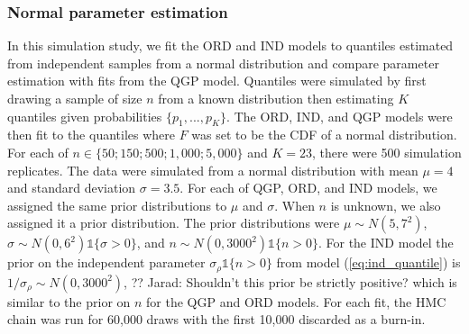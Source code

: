 \documentclass[preprint,12pt,authoryear]{elsarticle}
\newcommand{\1}[1]{\mathds{1}\left[#1\right]}
\newcommand{\jarad}[1]{{\color{red} ?? Jarad: #1}}
\begin{document}
\subsubsection{Normal parameter estimation}
In this simulation study, we fit the ORD and IND models to quantiles estimated 
from independent samples from a normal distribution and compare parameter 
estimation with fits from the QGP model. Quantiles were simulated by first 
drawing a sample of size $n$ from a known distribution then estimating $K$ 
quantiles given probabilities $\{p_1, ..., p_K\}$. The ORD, IND, and QGP models 
were then fit to the quantiles where $F$ was set to be the CDF of a normal 
distribution. For each of 
$n \in \{50; 150; 500; 1{,}000; 5{,}000\}$ and 
$K = 23$, there 
were 500 simulation replicates. The data were simulated from a normal 
distribution with mean $\mu = 4$ and standard deviation $\sigma = 3.5$.
For each of QGP, ORD, and IND models, we assigned the same prior distributions 
to $\mu$ and $\sigma$. When $n$ is unknown, we also assigned it a prior 
distribution. The prior distributions were $\mu \sim N(5,7^2)$, 
$\sigma \sim N(0, 6^2) \mathds{1} \{\sigma > 0\}$, and
$n \sim N(0,3000^2)\mathds{1}\{n > 0\}$.
For the IND model the prior on the independent parameter 
$\sigma_{\rho}\mathds{1}\{n > 0\}$ from model (\ref{eq:ind_quantile}) is 
$1/\sigma_{\rho} \sim N(0, 3000^2)$, 
\jarad{Shouldn't this prior be strictly positive?}
which is similar to the prior on $n$ for 
the QGP and ORD models. For each fit, the HMC chain was run for 60,000 draws 
with the first 10,000 discarded as a burn-in.
\end{document}
